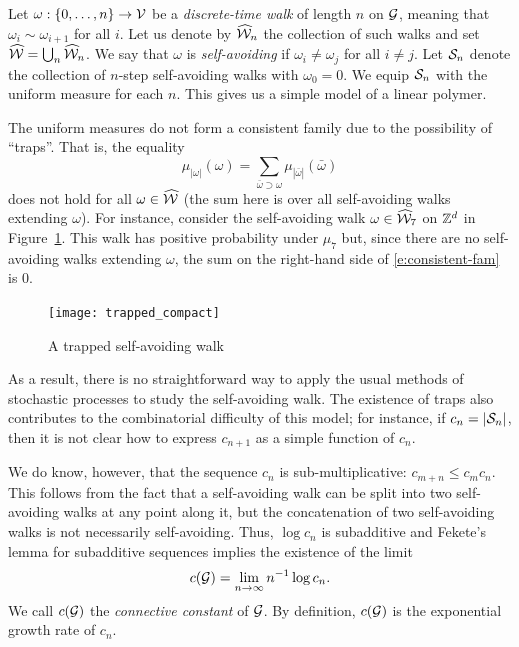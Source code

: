 \begin{example}
Let $\omega : \{0,\ldots,n\} \rightarrow \mathcal{V}$ be a \emph{discrete-time walk}
of length $n$ on $\mathcal{G}$, meaning that $\omega_i \sim \omega_{i+1}$ for all $i$. Let us
denote by $\widehat{\mathcal{W}}_n$ the collection of such walks and set $\widehat{\mathcal{W}} = \bigcup_n \widehat{\mathcal{W}}_n$.
We say that $\omega$ is \emph{self-avoiding} if $\omega_i \ne \omega_j$
for all $i \ne j$. Let $\mathcal{S}_n$ denote the collection of $n$-step
self-avoiding walks with $\omega_0 = 0$. We equip $\mathcal{S}_n$ with the uniform
measure for each $n$. This gives us a simple model of a linear polymer.

The uniform measures do not form a consistent family due to the possibility of ``traps''.
That is, the equality
\begin{equation}
\label{e:consistent-fam}
\mu_{|\omega|}(\omega) = \sum_{\bar\omega \supset \omega} \mu_{|\bar\omega|}(\bar\omega)
\end{equation}
does not hold for all $\omega\in\widehat{\mathcal{W}}$ (the sum here is over all self-avoiding walks extending $\omega$).
For instance, consider the self-avoiding walk $\omega\in\widehat{\mathcal{W}}_7$
on ${ {{\mathbb Z}}^d }$ in Figure~\ref{fig:trap}. This walk has positive probability under $\mu_7$ but,
since there are no self-avoiding walks extending $\omega$, the sum on the 
right-hand side of \eqref{e:consistent-fam} is $0$.

\begin{figure}[!htb]
\label{fig:trap}
\centering
\texttt{[image: trapped\_compact]}
\caption[Trapped SAW]{A trapped self-avoiding walk}
\end{figure}

As a result, there is no straightforward way to apply the usual methods of stochastic processes
to study the self-avoiding walk. The existence of traps also contributes to the
combinatorial difficulty of this model; for instance, if $c_n = |\mathcal{S}_n|$, then it is
not clear how to express $c_{n+1}$ as a simple function of $c_n$.

We do know, however, that the sequence $c_n$ is sub-multiplicative: $c_{m+n} \le c_m c_n$.
This follows from the fact that a self-avoiding walk can be split into two self-avoiding
walks at any point along it, but the concatenation of two self-avoiding walks is not
necessarily self-avoiding. Thus, $\log c_n$ is subadditive and
Fekete's lemma for subadditive sequences implies the existence of the limit
\begin{equation}
c(\mathcal{G}) = \lim_{n\rightarrow\infty} n^{-1} \log c_n.
\end{equation}
We call $c(\mathcal{G})$ the \emph{connective constant} of $\mathcal{G}$.
By definition, $c(\mathcal{G})$ is the exponential growth rate of $c_n$.
\end{example}

